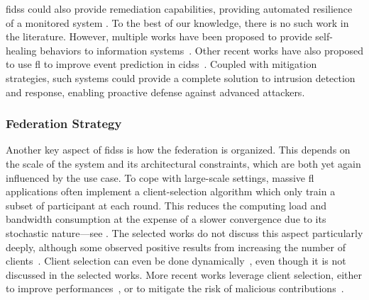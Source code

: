 \Glspl{fids} could also provide remediation capabilities, providing automated resilience of a monitored system \cite{ghosh_Selfhealingsystemssurvey_2007}.
To the best of our knowledge, there is no such work in the literature.
However, multiple works have been proposed to provide self-healing behaviors to information systems~\cite{elsadig_BiologicalIntrusionPrevention_2010,ali-tolppa_SELFHEALINGRESILIENCEFUTURE_2018}.
Other recent works have also proposed to use \gls{fl} to improve event prediction in \glspl{cids}~\cite{naseri_CerberusExploringFederated_2022}.
Coupled with mitigation strategies, such systems could provide a complete solution to intrusion detection and response, enabling proactive defense against advanced attackers.


\subsubsection{Federation Strategy\label{sec:sota.quali.fed}}

Another key aspect of \glspl{fids} is how the federation is organized.
This depends on the scale of the system and its architectural constraints, which are both yet again influenced by the use case.
To cope with large-scale settings, massive \gls{fl} applications often implement a client-selection algorithm which only train a subset of participant at each round.
This reduces the computing load and bandwidth consumption at the expense of a slower convergence due to its stochastic nature---see .
The selected works do not discuss this aspect particularly deeply, although some observed positive results from increasing the number of clients~\cite{li_DeepFedFederatedDeep_2020,schneble_Attackdetectionusing_2019,nguyen_DIoTFederatedSelflearning_2019}.
Client selection can even be done dynamically~\cite{zhang_DynamicFusionbased_2020}, even though it is not discussed in the selected works.
More recent works leverage client selection, either to improve performances~\cite{cheng_FederatedTransferLearning_2022}, or to mitigate the risk of malicious contributions~\cite{cunhaneto_FedSBSFederatedLearningparticipantselection_2024}.

